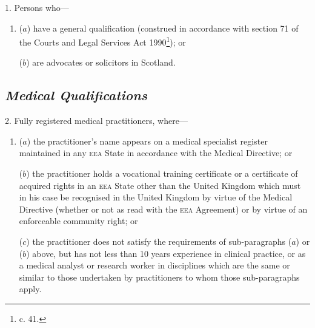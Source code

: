 \documentclass[12pt,a4paper]{article}
\begin{document}
\renewcommand\parthead{--- Schedule 3}

1.  Persons who—
\begin{enumerate}\item[]
($a$) have a general qualification (construed in accordance with section 71 of the Courts and Legal Services Act 1990\footnote{ c. 41.}); or

($b$) are advocates or solicitors in Scotland.
\end{enumerate}

\subsection*{\itshape Medical Qualifications}

2.  Fully registered medical practitioners, where—
\begin{enumerate}\item[]
($a$) the practitioner’s name appears on a medical specialist register maintained in any \textsc{\lowercase{EEA}} State in accordance with the Medical Directive; or

($b$) the practitioner holds a vocational training certificate or a certificate of acquired rights in an \textsc{\lowercase{EEA}} State other than the United Kingdom which must in his case be recognised in the United Kingdom by virtue of the Medical Directive (whether or not as read with the \textsc{\lowercase{EEA}} Agreement) or by virtue of an enforceable community right; or

($c$) the practitioner does not satisfy the requirements of sub-paragraphs ($a$) or ($b$) above, but has not less than 10 years experience in clinical practice, or as a medical analyst or research worker in disciplines which are the same or similar to those undertaken by practitioners to whom those sub-paragraphs apply.
\end{enumerate}

\medskip
\end{document}
